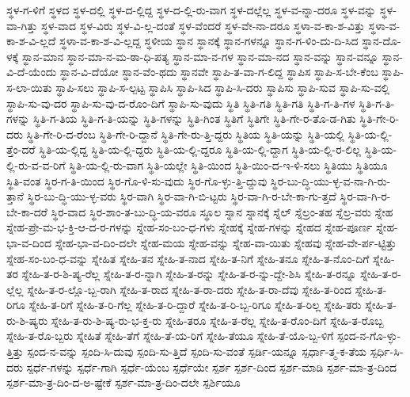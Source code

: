 {ಸ್ಥಳ-ಗ-ಳಿಗೆ
ಸ್ಥಳದ
ಸ್ಥಳ-ದಲ್ಲಿ
ಸ್ಥಳ-ದ-ಲ್ಲಿದ್ದ
ಸ್ಥಳ-ದ-ಲ್ಲಿ-ರು-ವಾಗ
ಸ್ಥಳ-ದಲ್ಲೆಲ್ಲ
ಸ್ಥಳ-ವ-ನ್ನಾ-ದರೂ
ಸ್ಥಳ-ವನ್ನು
ಸ್ಥಳ-ವಾ-ಗಿತ್ತು
ಸ್ಥಳ-ವಾದ
ಸ್ಥಳ-ವಿರು
ಸ್ಥಳ-ವಿ-ಲ್ಲ-ದಂತೆ
ಸ್ಥಳ-ವೆಂದರೆ
ಸ್ಥಳ-ವೇ-ನಾ-ದರೂ
ಸ್ಥಳಾ-ವ-ಕಾ-ಶ-ವಿತ್ತು
ಸ್ಥಳಾ-ವ-ಕಾ-ಶ-ವಿ-ಲ್ಲದೆ
ಸ್ಥಳಾ-ವ-ಕಾ-ಶ-ವಿ-ಲ್ಲದ್ದ
ಸ್ಥಳೀಯ
ಸ್ಥಾನ
ಸ್ಥಾನಕ್ಕೆ
ಸ್ಥಾನ-ಗಳನ್ನೂ
ಸ್ಥಾನ-ಗ-ಳಿಂ-ದು-ದಿ-ಸಿದ
ಸ್ಥಾನ-ದೊ-ಳಕ್ಕೆ
ಸ್ಥಾನ-ಮಾನ
ಸ್ಥಾನ-ಮಾ-ನ-ಮ-ಠಾ-ಧಿ-ಪತ್ಯ
ಸ್ಥಾನ-ಮಾ-ನ-ಗಳ
ಸ್ಥಾನ-ಮಾ-ನದ
ಸ್ಥಾನ-ವನ್ನು
ಸ್ಥಾನ-ವನ್ನೂ
ಸ್ಥಾನ-ವಿ-ದೆ-ಯೆಂದು
ಸ್ಥಾನ-ವಿ-ದೆಯೋ
ಸ್ಥಾನ-ವೆಂ-ಥದು
ಸ್ಥಾನವೇ
ಸ್ಥಾಪಿ-ತ-ವಾ-ಗ-ಲಿದ್ದ
ಸ್ಥಾಪಿಸ
ಸ್ಥಾಪಿ-ಸ-ಬೇ-ಕೆಂಬ
ಸ್ಥಾಪಿ-ಸ-ಲಾ-ಯಿತು
ಸ್ಥಾಪಿ-ಸಲು
ಸ್ಥಾಪಿ-ಸ-ಲ್ಪಟ್ಟ
ಸ್ಥಾಪಿಸಿ
ಸ್ಥಾಪಿ-ಸಿದ
ಸ್ಥಾಪಿ-ಸಿ-ದರು
ಸ್ಥಾಪಿಸು
ಸ್ಥಾಪಿ-ಸುವ
ಸ್ಥಾಪಿ-ಸು-ವಲ್ಲಿ
ಸ್ಥಾಪಿ-ಸು-ವು-ದರ
ಸ್ಥಾಪಿ-ಸು-ವು-ದ-ರೊಂ-ದಿಗೆ
ಸ್ಥಾಪಿ-ಸು-ವುದು
ಸ್ಥಿತಿ
ಸ್ಥಿತಿ-ಗತಿ
ಸ್ಥಿತಿ-ಗತಿ
ಸ್ಥಿತಿ-ಗ-ತಿ-ಗಳ
ಸ್ಥಿತಿ-ಗ-ತಿ-ಗಳನ್ನು
ಸ್ಥಿತಿ-ಗ-ತಿಯ
ಸ್ಥಿತಿ-ಗ-ತಿ-ಯನ್ನು
ಸ್ಥಿತಿ-ಗಳನ್ನು
ಸ್ಥಿತಿ-ಗಿಂತ
ಸ್ಥಿತಿಗೆ
ಸ್ಥಿತಿಗೇ
ಸ್ಥಿತಿ-ಗೇ-ರ-ತೊ-ಡ-ಗಿತು
ಸ್ಥಿತಿ-ಗೇ-ರಿ-ದರು
ಸ್ಥಿತಿ-ಗೇ-ರಿ-ದ-ರೆಂಬ
ಸ್ಥಿತಿ-ಗೇ-ರಿ-ದ್ದಾನೆ
ಸ್ಥಿತಿ-ಗೇ-ರು-ತ್ತಿ-ದ್ದರು
ಸ್ಥಿತಿಯ
ಸ್ಥಿತಿ-ಯನ್ನು
ಸ್ಥಿತಿ-ಯಲ್ಲಿ
ಸ್ಥಿತಿ-ಯ-ಲ್ಲಿ-ತ್ತೆಂ-ದರೆ
ಸ್ಥಿತಿ-ಯ-ಲ್ಲಿದ್ದ
ಸ್ಥಿತಿ-ಯ-ಲ್ಲಿ-ದ್ದರು
ಸ್ಥಿತಿ-ಯ-ಲ್ಲಿ-ದ್ದರೂ
ಸ್ಥಿತಿ-ಯ-ಲ್ಲಿ-ದ್ದಾಗ
ಸ್ಥಿತಿ-ಯ-ಲ್ಲಿ-ರ-ಲಿಲ್ಲ
ಸ್ಥಿತಿ-ಯ-ಲ್ಲಿ-ರು-ವ-ವ-ರಿಗೆ
ಸ್ಥಿತಿ-ಯ-ಲ್ಲಿ-ರು-ವಾಗ
ಸ್ಥಿತಿ-ಯಲ್ಲೇ
ಸ್ಥಿತಿ-ಯಿಂದ
ಸ್ಥಿತಿ-ಯಿಂ-ದ-ಇ-ಳಿ-ಸಲು
ಸ್ಥಿತಿಯು
ಸ್ಥಿತಿಯೂ
ಸ್ಥಿತಿ-ವಂತ
ಸ್ಥಿರ-ಗ-ತಿ-ಯಿಂದ
ಸ್ಥಿರ-ಗೊ-ಳಿ-ಸು-ವುದು
ಸ್ಥಿರ-ಗೊ-ಳ್ಳು-ತ್ತಿ-ದ್ದುವು
ಸ್ಥಿರ-ಬು-ದ್ಧಿ-ಯು-ಳ್ಳ-ವ-ನಾ-ಗಿ-ರು-ತ್ತಾನೆ
ಸ್ಥಿರ-ಬು-ದ್ಧಿ-ಯು-ಳ್ಳ-ವರು
ಸ್ಥಿರ-ವಾಗಿ
ಸ್ಥಿರ-ವಾ-ಗಿ-ಬಿ-ಟ್ಟರು
ಸ್ಥಿರ-ವಾ-ಗಿ-ರ-ಬೇ-ಕಾ-ಗು-ತ್ತದೆ
ಸ್ಥಿರ-ವಾ-ಗಿ-ರ-ಬೇ-ಕಾ-ದರೆ
ಸ್ಥಿರ-ವಾದ
ಸ್ಥಿರ-ಶಾಂ-ತ-ಬು-ದ್ಧಿ-ಯ-ವರೂ
ಸ್ಥೂಲ
ಸ್ನಾನ
ಸ್ನಾನಕ್ಕೆ
ಸ್ನೆಲ್
ಸ್ನೆಲ್ರಂ-ತಹ
ಸ್ನೆಲ್ರ-ವರು
ಸ್ನೇಹ
ಸ್ನೇಹ-ಪ್ರೇ-ಮ-ಭ-ಕ್ತಿ-ಆ-ದ-ರ-ಗಳನ್ನು
ಸ್ನೇಹ-ಸಂ-ಬಂ-ಧ-ಗಳು
ಸ್ನೇಹಕ್ಕೆ
ಸ್ನೇಹ-ಗಳನ್ನು
ಸ್ನೇಹದ
ಸ್ನೇಹ-ಪೂರ್ಣ
ಸ್ನೇಹ-ಭಾ-ವ-ದಿಂದ
ಸ್ನೇಹ-ಭಾ-ವ-ದಿಂ-ದಲೇ
ಸ್ನೇಹ-ಮಯ
ಸ್ನೇಹ-ವನ್ನು
ಸ್ನೇಹ-ವಾ-ಯಿತು
ಸ್ನೇಹವು
ಸ್ನೇಹ-ವೇ-ರ್ಪ-ಟ್ಟಿತ್ತು
ಸ್ನೇಹ-ಸಂ-ಬಂ-ಧ-ವನ್ನು
ಸ್ನೇಹಿತ
ಸ್ನೇಹಿ-ತನ
ಸ್ನೇಹಿ-ತ-ನಾದ
ಸ್ನೇಹಿ-ತ-ನಿಗೆ
ಸ್ನೇಹಿ-ತನೂ
ಸ್ನೇಹಿ-ತ-ನೊಂ-ದಿಗೆ
ಸ್ನೇಹಿ-ತರ
ಸ್ನೇಹಿ-ತ-ರ-ಶಿ-ಷ್ಯ-ರೆಲ್ಲ
ಸ್ನೇಹಿ-ತ-ರ-ನ್ನಾಗಿ
ಸ್ನೇಹಿ-ತ-ರನ್ನು
ಸ್ನೇಹಿ-ತ-ರ-ನ್ನು-ದ್ದೇ-ಶಿಸಿ
ಸ್ನೇಹಿ-ತ-ರನ್ನೂ
ಸ್ನೇಹಿ-ತ-ರ-ಲ್ಲೆಲ್ಲ
ಸ್ನೇಹಿ-ತ-ರ-ಲ್ಲೊ-ಬ್ಬ-ರಾಗಿ
ಸ್ನೇಹಿ-ತ-ರಾದ
ಸ್ನೇಹಿ-ತ-ರಾ-ದರು
ಸ್ನೇಹಿ-ತ-ರಾ-ದೆವು
ಸ್ನೇಹಿ-ತ-ರಿಂದ
ಸ್ನೇಹಿ-ತ-ರಿಗೂ
ಸ್ನೇಹಿ-ತ-ರಿಗೆ
ಸ್ನೇಹಿ-ತ-ರಿ-ಗೆಲ್ಲ
ಸ್ನೇಹಿ-ತ-ರಿ-ದ್ದಾರೆ
ಸ್ನೇಹಿ-ತ-ರಿ-ಬ್ಬ-ರಿಗೂ
ಸ್ನೇಹಿ-ತ-ರಿಲ್ಲ
ಸ್ನೇಹಿ-ತರು
ಸ್ನೇಹಿ-ತ-ರು-ಶಿ-ಷ್ಯರು
ಸ್ನೇಹಿ-ತ-ರು-ಶಿ-ಷ್ಯ-ರು-ಭ-ಕ್ತ-ರು
ಸ್ನೇಹಿ-ತರೂ
ಸ್ನೇಹಿ-ತ-ರೆಲ್ಲ
ಸ್ನೇಹಿ-ತ-ರೊಂ-ದಿಗೆ
ಸ್ನೇಹಿ-ತ-ರೊಬ್ಬ
ಸ್ನೇಹಿ-ತ-ರೊ-ಬ್ಬರು
ಸ್ನೇಹಿತೆ
ಸ್ನೇಹಿ-ತೆಗೆ
ಸ್ನೇಹಿ-ತೆ-ಯ-ರಿಗೆ
ಸ್ನೇಹಿ-ತೆಯೂ
ಸ್ನೇಹಿ-ತೆ-ಯೊ-ಬ್ಬ-ಳಿಗೆ
ಸ್ಪಂದ-ನ-ಗೊ-ಳ್ಳು-ತ್ತಿತ್ತು
ಸ್ಪಂದ-ನ-ವನ್ನು
ಸ್ಪಂದಿ-ಸಿ-ದುವು
ಸ್ಪಂದಿ-ಸು-ತ್ತಿದೆ
ಸ್ಪಂದಿ-ಸು-ವಂತೆ
ಸ್ಪರ್ಡಿ-ಯನ್ನೂ
ಸ್ಪರ್ಧಾ-ತ್ಮ-ಕ-ತೆಯ
ಸ್ಪರ್ಧಿ-ಸಿ-ದರು
ಸ್ಪರ್ಧೆ-ಗಳನ್ನು
ಸ್ಪರ್ಧೆ-ಗಾಗಿ
ಸ್ಪರ್ಧೆ-ಯೆಂಬ
ಸ್ಪರ್ಧೆಯೇ
ಸ್ಪರ್ಶ
ಸ್ಪರ್ಶ-ದಿಂದ
ಸ್ಪರ್ಶ-ಮಾಡಿ
ಸ್ಪರ್ಶ-ಮಾ-ತ್ರ-ದಿಂದ
ಸ್ಪರ್ಶ-ಮಾ-ತ್ರ-ದಿಂ-ದ-ಅ-ಷ್ಟೇಕೆ
ಸ್ಪರ್ಶ-ಮಾ-ತ್ರ-ದಿಂ-ದಲೇ
ಸ್ಪರ್ಶಿಯೂ
}
